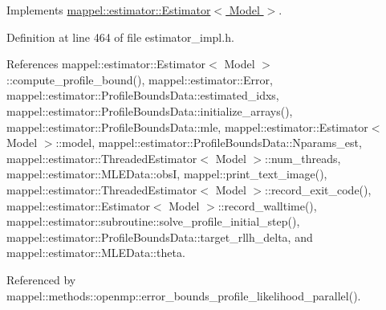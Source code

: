 Implements \hyperlink{classmappel_1_1estimator_1_1Estimator_a6d68d18f228f610b02bbffbe4c7441e6}{mappel\+::estimator\+::\+Estimator$<$ Model $>$}.



Definition at line 464 of file estimator\+\_\+impl.\+h.



References mappel\+::estimator\+::\+Estimator$<$ Model $>$\+::compute\+\_\+profile\+\_\+bound(), mappel\+::estimator\+::\+Error, mappel\+::estimator\+::\+Profile\+Bounds\+Data\+::estimated\+\_\+idxs, mappel\+::estimator\+::\+Profile\+Bounds\+Data\+::initialize\+\_\+arrays(), mappel\+::estimator\+::\+Profile\+Bounds\+Data\+::mle, mappel\+::estimator\+::\+Estimator$<$ Model $>$\+::model, mappel\+::estimator\+::\+Profile\+Bounds\+Data\+::\+Nparams\+\_\+est, mappel\+::estimator\+::\+Threaded\+Estimator$<$ Model $>$\+::num\+\_\+threads, mappel\+::estimator\+::\+M\+L\+E\+Data\+::obsI, mappel\+::print\+\_\+text\+\_\+image(), mappel\+::estimator\+::\+Threaded\+Estimator$<$ Model $>$\+::record\+\_\+exit\+\_\+code(), mappel\+::estimator\+::\+Estimator$<$ Model $>$\+::record\+\_\+walltime(), mappel\+::estimator\+::subroutine\+::solve\+\_\+profile\+\_\+initial\+\_\+step(), mappel\+::estimator\+::\+Profile\+Bounds\+Data\+::target\+\_\+rllh\+\_\+delta, and mappel\+::estimator\+::\+M\+L\+E\+Data\+::theta.



Referenced by mappel\+::methods\+::openmp\+::error\+\_\+bounds\+\_\+profile\+\_\+likelihood\+\_\+parallel().

